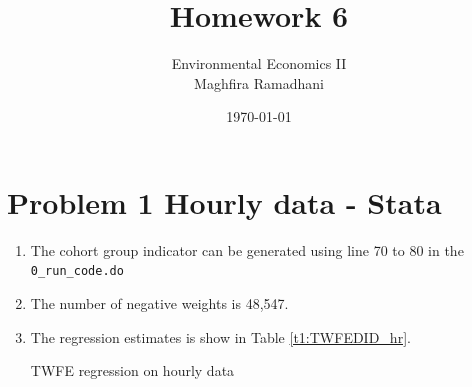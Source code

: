 \documentclass{article}
\begin{document}
 
\title{Homework 6}
\author{Environmental Economics II\\
Maghfira Ramadhani}
\date{\today}
\maketitle

\section*{Problem 1 Hourly data - Stata}
\begin{enumerate}
    \item The cohort group indicator can be generated using line 70 to 80 in the \verb!0_run_code.do!
    \item The number of negative weights is 48,547.
    \item The regression estimates is show in Table \ref{t1:TWFEDID_hr}.
    \begin{table}[H]\centering
        \caption{TWFE regression on hourly data}
        \label{t1:TWFEDID_hr}
        \begin{threeparttable}
        
        \end{threeparttable}
        \end{table}
\end{enumerate}
\end{document}
